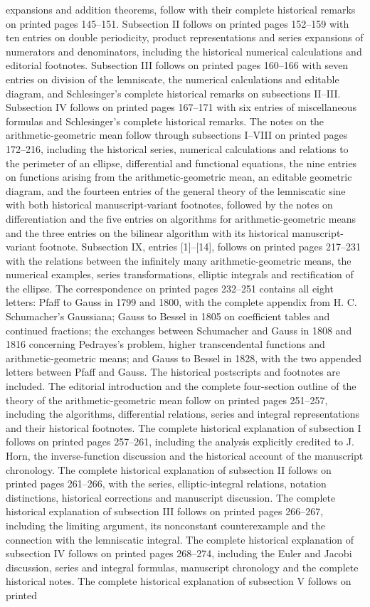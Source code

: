 expansions and addition theorems, follow with their complete historical remarks on printed pages 145–151. Subsection II follows on printed pages 152–159 with ten entries on double periodicity, product representations and series expansions of numerators and denominators, including the historical numerical calculations and editorial footnotes. Subsection III follows on printed pages 160–166 with seven entries on division of the lemniscate, the numerical calculations and editable diagram, and Schlesinger’s complete historical remarks on subsections II–III. Subsection IV follows on printed pages 167–171 with six entries of miscellaneous formulas and Schlesinger’s complete historical remarks. The notes on the arithmetic-geometric mean follow through subsections I–VIII on printed pages 172–216, including the historical series, numerical calculations and relations to the perimeter of an ellipse, differential and functional equations, the nine entries on functions arising from the arithmetic-geometric mean, an editable geometric diagram, and the fourteen entries of the general theory of the lemniscatic sine with both historical manuscript-variant footnotes, followed by the notes on differentiation and the five entries on algorithms for arithmetic-geometric means and the three entries on the bilinear algorithm with its historical manuscript-variant footnote. Subsection IX, entries [1]–[14], follows on printed pages 217–231 with the relations between the infinitely many arithmetic-geometric means, the numerical examples, series transformations, elliptic integrals and rectification of the ellipse. The correspondence on printed pages 232–251 contains all eight letters: Pfaff to Gauss in 1799 and 1800, with the complete appendix from H. C. Schumacher’s Gaussiana; Gauss to Bessel in 1805 on coefficient tables and continued fractions; the exchanges between Schumacher and Gauss in 1808 and 1816 concerning Pedrayes’s problem, higher transcendental functions and arithmetic-geometric means; and Gauss to Bessel in 1828, with the two appended letters between Pfaff and Gauss. The historical postscripts and footnotes are included. The editorial introduction and the complete four-section outline of the theory of the arithmetic-geometric mean follow on printed pages 251–257, including the algorithms, differential relations, series and integral representations and their historical footnotes. The complete historical explanation of subsection I follows on printed pages 257–261, including the analysis explicitly credited to J. Horn, the inverse-function discussion and the historical account of the manuscript chronology. The complete historical explanation of subsection II follows on printed pages 261–266, with the series, elliptic-integral relations, notation distinctions, historical corrections and manuscript discussion. The complete historical explanation of subsection III follows on printed pages 266–267, including the limiting argument, its nonconstant counterexample and the connection with the lemniscatic integral. The complete historical explanation of subsection IV follows on printed pages 268–274, including the Euler and Jacobi discussion, series and integral formulas, manuscript chronology and the complete historical notes. The complete historical explanation of subsection V follows on printed 